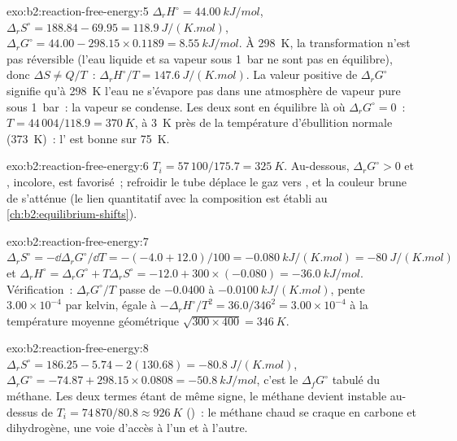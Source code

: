 \begin{solution}{exo:b2:reaction-free-energy:5}
$\Delta_r H^\circ = \qty{44.00}{kJ/mol}$, $\Delta_r S^\circ = 188.84 - 69.95 =
\qty{118.9}{J/(K.mol)}$, $\Delta_r G^\circ = 44.00 - 298.15 \times 0.1189 =
\qty{+8.55}{kJ/mol}$. À \qty{298}{K}, la transformation n'est pas réversible (l'eau
liquide et sa vapeur sous \qty{1}{bar} ne sont pas en équilibre), donc $\Delta S \ne
Q/T$~: $\Delta_r H^\circ/T = \qty{147.6}{J/(K.mol)}$. La valeur positive de
$\Delta_r G^\circ$ signifie qu'à \qty{298}{K} l'eau ne s'évapore pas dans
une atmosphère de vapeur pure sous \qty{1}{bar}~: la vapeur se condense. Les deux
sont en équilibre là où $\Delta_r G^\circ = 0$~: $T = 44\,004/118.9 =
\qty{370}{K}$, à \qty{3}{K} près de la température d'ébullition normale
(\qty{373}{K})~: l' est bonne sur \qty{75}{K}.
\end{solution}

\begin{solution}{exo:b2:reaction-free-energy:6}
$T_i = 57\,100/175.7 = \qty{325}{K}$. Au-dessous, $\Delta_r G^\circ > 0$ et
, incolore, est favorisé~; refroidir le tube déplace le gaz vers
, et la couleur brune de  s'atténue (le lien quantitatif avec
la composition est établi au \cref{ch:b2:equilibrium-shifts}).
\end{solution}

\begin{solution}{exo:b2:reaction-free-energy:7}
$\Delta_r S^\circ = -\dd\Delta_r G^\circ/\dd T = -(-4.0 + 12.0)/100 =
\qty{-0.080}{kJ/(K.mol)} = \qty{-80}{J/(K.mol)}$ et $\Delta_r H^\circ =
\Delta_r G^\circ + T\Delta_r S^\circ = -12.0 + 300 \times (-0.080) =
\qty{-36.0}{kJ/mol}$. Vérification~: $\Delta_r G^\circ/T$ passe de $-0.0400$ à
$\qty{-0.0100}{kJ/(K.mol)}$, pente $3.00 \times 10^{-4}$ par kelvin, égale à
$-\Delta_r H^\circ/T^2 = 36.0/346^2 = 3.00 \times 10^{-4}$ à la température
moyenne géométrique $\sqrt{300 \times 400} = \qty{346}{K}$.
\end{solution}

\begin{solution}{exo:b2:reaction-free-energy:8}
$\Delta_r S^\circ = 186.25 - 5.74 - 2(130.68) = \qty{-80.8}{J/(K.mol)}$,
$\Delta_r G^\circ = -74.87 + 298.15 \times 0.0808 = \qty{-50.8}{kJ/mol}$,
c'est le $\Delta_f G^\circ$ tabulé du méthane. Les deux termes étant de même
signe, le méthane devient instable au-dessus de $T_i = 74\,870/80.8 \approx
\qty{926}{K}$ ()~: le méthane chaud se craque en carbone et
dihydrogène, une voie d'accès à l'un et à l'autre.
\end{solution}

